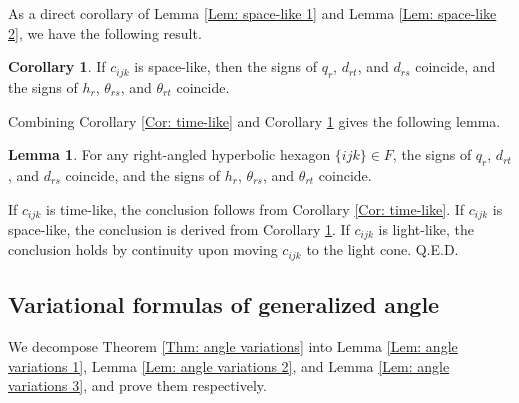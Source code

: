 \documentclass[12pt]{amsart}
\theoremstyle{definition}
\newtheorem{lemma}[theorem]{Lemma}
\newtheorem{corollary}[theorem]{Corollary}
\def\qed{\hfill{Q.E.D.}\smallskip}
\begin{document}
As a direct corollary of Lemma \ref{Lem: space-like 1} and Lemma \ref{Lem: space-like 2}, we have the following result.

\begin{corollary}\label{Cor: space-like}
If $c_{ijk}$ is space-like,
then the signs of $q_r$, $d_{rt}$, and $d_{rs}$ coincide, and the signs of $h_r$, $\theta_{rs}$, and $\theta_{rt}$ coincide.
\end{corollary}

Combining Corollary \ref{Cor: time-like} and Corollary \ref{Cor: space-like} gives the following lemma.
\begin{lemma}\label{Lem: time-space-like}
For any right-angled hyperbolic  hexagon $\{ijk\}\in F$,
the signs of $q_r$, $d_{rt}$, and $d_{rs}$ coincide, and the signs of $h_r$, $\theta_{rs}$, and $\theta_{rt}$ coincide.
\end{lemma}
\proof
If $c_{ijk}$ is time-like, the conclusion follows from Corollary \ref{Cor: time-like}.
If $c_{ijk}$ is space-like, the conclusion is derived from Corollary \ref{Cor: space-like}.
If $c_{ijk}$ is light-like, the conclusion holds by continuity upon moving $c_{ijk}$ to the light cone.  
\qed


\subsection{Variational formulas of generalized angle}

We decompose Theorem \ref{Thm: angle variations} into Lemma \ref{Lem: angle variations 1}, Lemma \ref{Lem: angle variations 2}, and Lemma \ref{Lem: angle variations 3}, and prove them respectively.
\end{document}
